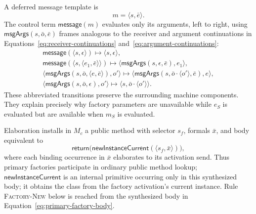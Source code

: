 \documentclass[11pt]{article}
\numberwithin{equation}{section}
\newcommand{\kw}[1]{\ensuremath{\mathsf{#1}}}
\newcommand{\rulelabel}[1]{\textsc{#1}}
\begin{document}
A deferred message template is
\begin{equation}\label{eq:message-template-domain}
 m=\langle s,\bar e\rangle.
\end{equation}
The control term
$\kw{message}(m)$ evaluates only its arguments, left to right, using
$\kw{msgArgs}(s,\bar o,\bar e)$ frames analogous to the receiver and argument
continuations in Equations~\eqref{eq:receiver-continuations}
and~\eqref{eq:argument-continuations}:
\begin{equation}\label{eq:message-evaluation}
\begin{array}{c}
 \kw{message}(\langle s,\epsilon\rangle)
      \longmapsto\langle s,\epsilon\rangle,\\[1mm]
 \kw{message}(\langle s,\langle e_1,\bar e\rangle\rangle)
      \longmapsto
      \langle\kw{msgArgs}(s,\epsilon,\bar e),e_1\rangle,\\[1mm]
 \langle\kw{msgArgs}(s,\bar o,\langle e,\bar e\rangle),o'\rangle
      \longmapsto
      \langle\kw{msgArgs}(s,\bar o\cdot\langle o'\rangle,\bar e),e\rangle,\\[1mm]
 \langle\kw{msgArgs}(s,\bar o,\epsilon),o'\rangle
      \longmapsto\langle s,\bar o\cdot\langle o'\rangle\rangle.
\end{array}
\end{equation}
These abbreviated transitions preserve the surrounding machine components.
They explain precisely why factory parameters are unavailable while $e_S$ is
evaluated but are available when $m_S$ is evaluated.

Elaboration installs in $M_c$ a public method with selector $s_f$, formals
$\bar x$, and body equivalent to
\begin{equation}\label{eq:primary-factory-body}
 \kw{return}\bigl(\kw{newInstanceCurrent}
   (\langle s_f,\bar x\rangle)\bigr),
\end{equation}
where each binding occurrence in $\bar x$ elaborates to its activation send.
Thus primary factories participate in ordinary public method lookup;
$\kw{newInstanceCurrent}$ is an internal primitive occurring only in this
synthesized body; it obtains the class from the factory activation's current
instance.  Rule \rulelabel{Factory-New} below is reached from the synthesized
body in Equation~\eqref{eq:primary-factory-body}.
\end{document}
